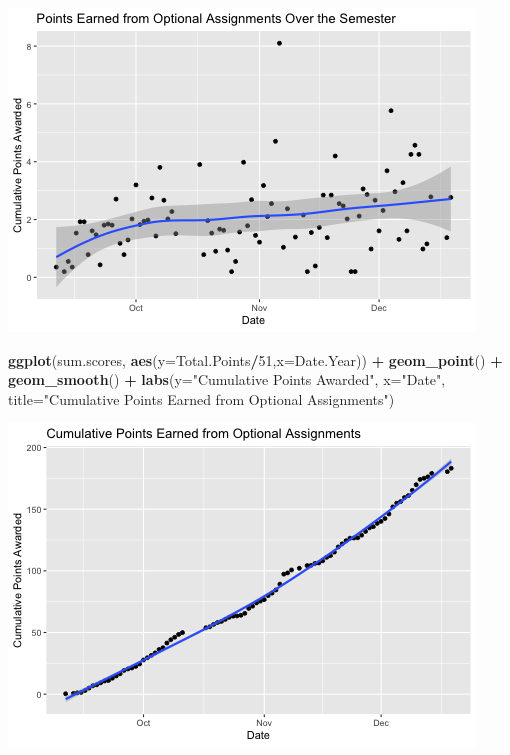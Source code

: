 \documentclass[]{article}
\newenvironment{Shaded}{\begin{snugshade}}{\end{snugshade}}
\newcommand{\KeywordTok}[1]{\textcolor[rgb]{0.13,0.29,0.53}{\textbf{#1}}}
\newcommand{\DataTypeTok}[1]{\textcolor[rgb]{0.13,0.29,0.53}{#1}}
\newcommand{\DecValTok}[1]{\textcolor[rgb]{0.00,0.00,0.81}{#1}}
\newcommand{\StringTok}[1]{\textcolor[rgb]{0.31,0.60,0.02}{#1}}
\newcommand{\OperatorTok}[1]{\textcolor[rgb]{0.81,0.36,0.00}{\textbf{#1}}}
\newcommand{\NormalTok}[1]{#1}
\begin{document}
\includegraphics{figures/submitted-assignments-1.png}

\begin{Shaded}
\begin{Highlighting}[]
\KeywordTok{ggplot}\NormalTok{(sum.scores, }\KeywordTok{aes}\NormalTok{(}\DataTypeTok{y=}\NormalTok{Total.Points}\OperatorTok{/}\DecValTok{51}\NormalTok{,}\DataTypeTok{x=}\NormalTok{Date.Year)) }\OperatorTok{+}
\StringTok{  }\KeywordTok{geom_point}\NormalTok{() }\OperatorTok{+}
\StringTok{  }\KeywordTok{geom_smooth}\NormalTok{() }\OperatorTok{+}
\StringTok{  }\KeywordTok{labs}\NormalTok{(}\DataTypeTok{y=}\StringTok{"Cumulative Points Awarded"}\NormalTok{,}
       \DataTypeTok{x=}\StringTok{"Date"}\NormalTok{,}
       \DataTypeTok{title=}\StringTok{"Cumulative Points Earned from Optional Assignments"}\NormalTok{)}
\end{Highlighting}
\end{Shaded}

\includegraphics{figures/submitted-assignments-2.png}
\end{document}
